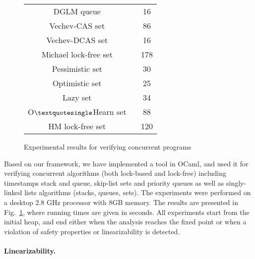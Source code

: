 \begin{figure}[]
\begin{tabular}{|c | c | }
\textsf{DGLM queue  ~\cite{Doherty:lockfree}}&  \textsf {16} \\

\textsf{Vechev-CAS set  ~\cite{Vechev:list}}  & \textsf{86} \\

\textsf{Vechev-DCAS set  ~\cite{Vechev:list}}   & \textsf{16}  \\

\textsf{Michael lock-free set ~\cite{Michael:list}}  & \textsf{178}  \\

\textsf{Pessimistic set  ~\cite{ArtOfMpP}}&\textsf{30} \\

\textsf{Optimistic set ~\cite{ArtOfMpP}}& \textsf{25} \\

\textsf{Lazy set ~\cite{Lazyset}  }  & \textsf {34} \\

\textsf {O$\textquotesingle $Hearn set  ~\cite{OHearnlist}}     & \textsf{88} \\

\textsf{HM lock-free set  ~\cite{ArtOfMpP} } & \textsf{120} \\
\hline
\end{tabular}

\caption{Experimental results for verifying concurrent programs}
\label{Experiments:fig}
\end{figure}
Based on our framework, we have implemented a tool in OCaml, and used
it for
verifying concurrent algorithms (both lock-based and lock-free)
including timestamps stack and queue, skip-list sets and priority queues as well as singly-linked lists algorithms (stacks, queues, sets). The experiments were performed on a desktop 2.8 GHz processor with 8GB memory. The results are presented in Fig.~\ref{Experiments:fig}, where running times are given in seconds. 
All experiments start from the initial heap,  
and end either when the analysis reaches the fixed point or when a violation of safety properties or linearizability is detected. 

\paragraph{Linearizability.}

